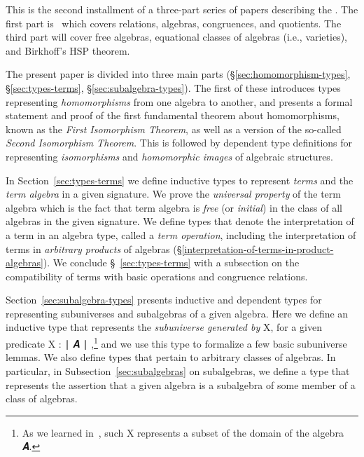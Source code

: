 \documentclass[a4paper,UKenglish,cleveref,autoref,thm-restate,12pt]{../lipics-v2021-wjd}
\begin{document}
This is the second installment of a three-part series of papers describing the \agdaualib. The first part is~\cite{DeMeo:2021-1} which covers relations, algebras, congruences, and quotients. The third part will cover free algebras, equational classes of algebras (i.e., varieties), and Birkhoff's HSP theorem.

The present paper is divided into three main parts (\S\ref{sec:homomorphism-types}, \S\ref{sec:types-terms}, \S\ref{sec:subalgebra-types}).  The first of these introduces types representing \emph{homomorphisms} from one algebra to another, and presents a formal statement and proof of the first fundamental theorem about homomorphisms, known as the \emph{First Isomorphism Theorem}, as well as a version of the so-called \emph{Second Isomorphism Theorem}. This is followed by dependent type definitions for representing \emph{isomorphisms} and \emph{homomorphic images} of algebraic structures.

In Section~\ref{sec:types-terms} we define inductive types to represent \emph{terms} and the \emph{term algebra} in a given signature. We prove the \emph{universal property} of the term algebra which is the fact that term algebra is \emph{free} (or \emph{initial}) in the class of all algebras in the given signature.  We define types that denote the interpretation of a term in an algebra type, called a \emph{term operation}, including the interpretation of terms in \emph{arbitrary products} of algebras (\S\ref{interpretation-of-terms-in-product-algebras}). We conclude \S~\ref{sec:types-terms} with a subsection on the compatibility of terms with basic operations and congruence relations.

Section~\ref{sec:subalgebra-types} presents inductive and dependent types for representing subuniverses and subalgebras of a given algebra. Here we define an inductive type that represents the \emph{subuniverse generated by} \ab X, for a given predicate \ab X \as :  \af ∣ \ab 𝑨 \af ∣ \AgdaUnderscore,\footnote{As we learned in~\cite{DeMeo:2021-1}, such \ab X represents a subset of the domain of the algebra \ab 𝑨.} and we use this type to formalize a few basic subuniverse lemmas.  We also define types that pertain to arbitrary classes of algebras. In particular, in Subsection~\ref{sec:subalgebras} on subalgebras, we define a type that represents the assertion that a given algebra is a subalgebra of some member of a class of algebras.
\end{document}
